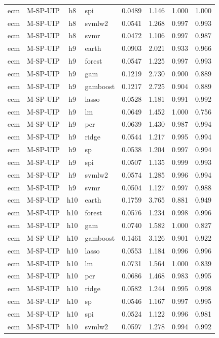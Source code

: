 \begin{ThreePartTable}
\begin{longtable}[t]{llclcccc}
ecm & M-SP-UIP & h8 & spi & 0.0489 & 1.146 & 1.000 & 1.000\\
ecm & M-SP-UIP & h8 & svmlw2 & 0.0541 & 1.268 & 0.997 & 0.993\\
ecm & M-SP-UIP & h8 & svmr & 0.0472 & 1.106 & 0.997 & 0.987\\
\addlinespace
ecm & M-SP-UIP & h9 & earth & 0.0903 & 2.021 & 0.933 & 0.966\\
ecm & M-SP-UIP & h9 & forest & 0.0547 & 1.225 & 0.997 & 0.993\\
ecm & M-SP-UIP & h9 & gam & 0.1219 & 2.730 & 0.900 & 0.889\\
ecm & M-SP-UIP & h9 & gamboost & 0.1217 & 2.725 & 0.904 & 0.889\\
ecm & M-SP-UIP & h9 & lasso & 0.0528 & 1.181 & 0.991 & 0.992\\
ecm & M-SP-UIP & h9 & lm & 0.0649 & 1.452 & 1.000 & 0.756\\
ecm & M-SP-UIP & h9 & pcr & 0.0639 & 1.430 & 0.987 & 0.994\\
ecm & M-SP-UIP & h9 & ridge & 0.0544 & 1.217 & 0.995 & 0.994\\
ecm & M-SP-UIP & h9 & sp & 0.0538 & 1.204 & 0.997 & 0.994\\
ecm & M-SP-UIP & h9 & spi & 0.0507 & 1.135 & 0.999 & 0.993\\
ecm & M-SP-UIP & h9 & svmlw2 & 0.0574 & 1.285 & 0.996 & 0.994\\
ecm & M-SP-UIP & h9 & svmr & 0.0504 & 1.127 & 0.997 & 0.988\\
\addlinespace
ecm & M-SP-UIP & h10 & earth & 0.1759 & 3.765 & 0.881 & 0.949\\
ecm & M-SP-UIP & h10 & forest & 0.0576 & 1.234 & 0.998 & 0.996\\
ecm & M-SP-UIP & h10 & gam & 0.0740 & 1.582 & 1.000 & 0.827\\
ecm & M-SP-UIP & h10 & gamboost & 0.1461 & 3.126 & 0.901 & 0.922\\
ecm & M-SP-UIP & h10 & lasso & 0.0553 & 1.184 & 0.996 & 0.996\\
ecm & M-SP-UIP & h10 & lm & 0.0731 & 1.564 & 1.000 & 0.839\\
ecm & M-SP-UIP & h10 & pcr & 0.0686 & 1.468 & 0.983 & 0.995\\
ecm & M-SP-UIP & h10 & ridge & 0.0582 & 1.244 & 0.995 & 0.998\\
ecm & M-SP-UIP & h10 & sp & 0.0546 & 1.167 & 0.997 & 0.995\\
ecm & M-SP-UIP & h10 & spi & 0.0524 & 1.122 & 0.996 & 0.981\\
ecm & M-SP-UIP & h10 & svmlw2 & 0.0597 & 1.278 & 0.994 & 0.992\\

\end{longtable}
\end{ThreePartTable}
